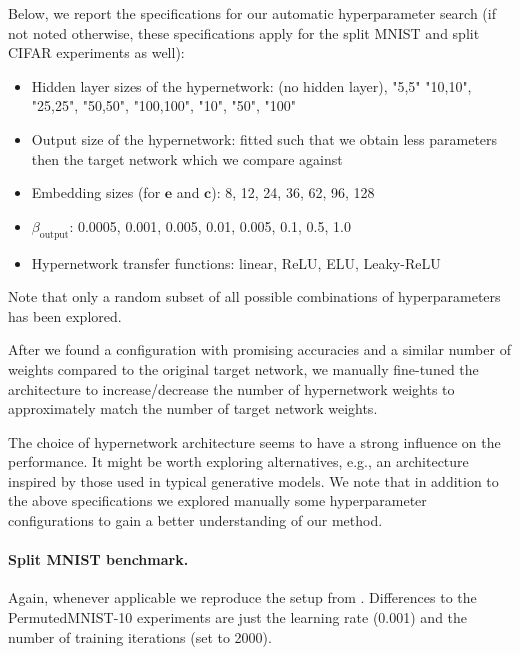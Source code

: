 \documentclass{article}
\begin{document}
Below, we report the specifications for our automatic hyperparameter search (if not noted otherwise, these specifications apply for the split MNIST and split CIFAR experiments as well):
\begin{itemize}
    \item Hidden layer sizes of the hypernetwork: (no hidden layer), "5,5" "10,10", "25,25", "50,50", "100,100", "10", "50", "100"
    \item Output size of the hypernetwork: fitted such that we obtain less parameters then the target network which we compare against
    \item Embedding sizes (for $\mathbf{e}$ and $\mathbf{c}$): 8, 12, 24, 36, 62, 96, 128
    \item $\beta_\text{output}$: 0.0005, 0.001, 0.005, 0.01, 0.005, 0.1, 0.5, 1.0
     \item Hypernetwork transfer functions: linear, ReLU, ELU, Leaky-ReLU
\end{itemize}

Note that only a random subset of all possible combinations of hyperparameters has been explored.

After we found a configuration with promising accuracies and a similar number of weights compared to the original target network, we manually fine-tuned the architecture to increase/decrease the number of hypernetwork weights to approximately match the number of target network weights.

The choice of hypernetwork architecture seems to have a strong influence on the performance. It might be worth exploring alternatives, e.g., an architecture inspired by those used in typical generative models. We note that in addition to the above specifications we explored manually some hyperparameter configurations to gain a better understanding of our method.

\paragraph{Split MNIST benchmark.}

Again, whenever applicable we reproduce the setup from \citet{van_de_ven_three_2019}. Differences to the PermutedMNIST-10 experiments are just the learning rate (0.001) and the number of training iterations (set to 2000).
\end{document}
